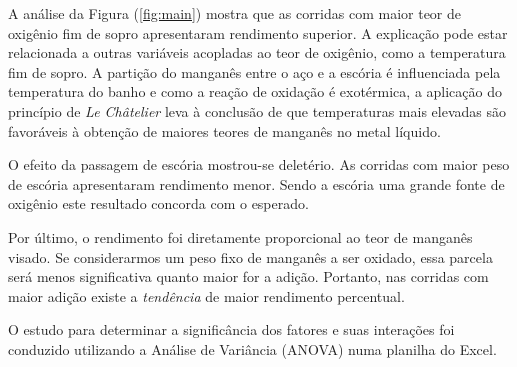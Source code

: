 		A análise da Figura (\ref{fig:main}) mostra que as corridas com maior teor de oxigênio fim de sopro apresentaram rendimento superior. A explicação pode estar relacionada a outras variáveis acopladas ao teor de oxigênio, como a temperatura fim de sopro. A partição do manganês entre o aço e a escória é influenciada pela temperatura do banho e como a reação de oxidação é exotérmica, a aplicação do princípio de \textit{Le Châtelier} leva à conclusão de que temperaturas mais elevadas são favoráveis à obtenção de maiores teores de manganês no metal líquido\cite{barao}.

		O efeito da passagem de escória mostrou-se deletério. As corridas com maior peso de escória apresentaram rendimento menor. Sendo a escória uma grande fonte de oxigênio este resultado concorda com o esperado.
		
		Por último, o rendimento foi diretamente proporcional ao teor de manganês visado. Se considerarmos um peso fixo de manganês a ser oxidado, essa parcela será menos significativa quanto maior for a adição. Portanto, nas corridas com maior adição existe a \textit{tendência} de maior rendimento percentual.
		
		O estudo para determinar a significância dos fatores e suas interações foi conduzido utilizando a Análise de Variância (ANOVA)\cite{wiki:anova} numa planilha do Excel.
		
